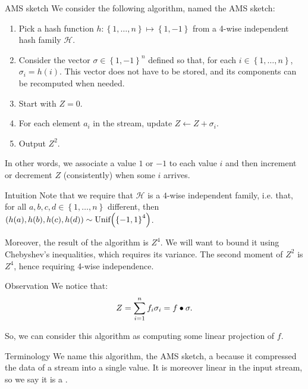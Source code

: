 \documentclass[a4paper]{article}
\begin{document}
\begin{parag}{AMS sketch}
    We consider the following algorithm, named the AMS sketch:
    \begin{enumerate}
        \item Pick a hash function $h: \left\{1, \ldots, n\right\} \mapsto \left\{1, -1\right\}$ from a 4-wise independent hash family $\mathcal{H}$.
        \item Consider the vector $\sigma \in \left\{1, -1\right\}^n$ defined so that, for each $i \in \left\{1, \ldots, n\right\}$, $\sigma_i = h\left(i\right)$. This vector does not have to be stored, and its components can be recomputed when needed.
        \item Start with $Z = 0$.
        \item For each element $a_i$ in the stream, update $Z \leftarrow Z + \sigma_i$.
        \item Output $Z^2$.
    \end{enumerate}

    In other words, we associate a value $1$ or $-1$ to each value $i$ and then increment or decrement $Z$ (consistently) when some $i$ arrives.

    \begin{subparag}{Intuition}
        Note that we require that $\mathcal{H}$ is a $4$-wise independent family, i.e. that, for all $a, b, c, d \in \left\{1, \ldots, n\right\}$ different, then $\left(h\left(a\right), h\left(b\right), h\left(c\right), h\left(d\right)\right) \followsdistr \text{Unif}\left(\left\{-1, 1\right\}^4\right)$.

        Moreover, the result of the algorithm is $Z^4$. We will want to bound it using Chebyshev's inequalities, which requires its variance. The second moment of $Z^2$ is $Z^4$, hence requiring 4-wise independence.
    \end{subparag}

    \begin{subparag}{Observation}
        We notice that: 
        \[Z = \sum_{i = 1}^{n} f_i \sigma_i = f \bullet \sigma.\]
        
        So, we can consider this algorithm as computing some linear projection of $f$.
    \end{subparag}

    \begin{subparag}{Terminology}
        We name this algorithm, the AMS sketch, a  because it compressed the data of a stream into a single value. It is moreover linear in the input stream, so we say it is a .
    \end{subparag}
\end{parag}
\end{document}
